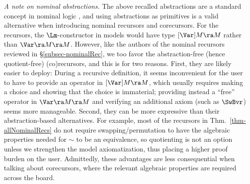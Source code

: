 \smallskip
\emph{A %
	note on nominal abstractions.} 
The above recalled abstractions are a standard concept in nominal logic \cite{DBLP:conf/lics/GabbayP99}, and using abstractions as primitives is a valid alternative when introducing nominal recursors and corecursors. For the recursors, %
the $\Lm$-constructor in models would have type $[\Var]M \ra M$ rather than $\Var \ra M \ra M$. 
%
However, %
like the authors of the nominal recursors reviewed in \S\ref{subsec-nominalRec}, we too %
favor the abstraction-free (hence quotient-free) (co)recursors, and this is for two reasons. First, they are likely easier to deploy:  
During a recursive definition, it seems inconvenient for the user to have to provide an operator in $[\Var]M \ra M$, which usually requires making a choice and showing that the choice is immaterial; providing instead a ``free''  operator in $\Var \ra M \ra M$ and verifying an additional axiom (such as $\SwBvr$) seems more manageable. Second, 
they can be more expressive than their abstraction-based alternatives. For example, most of the recursors in Thm.~\ref{thm-allNominalRecs} do not require swapping/permutation to have the algebraic properties needed for $\sim$ to be an equivalence, so quotienting is not an option unless we %
strengthen the model axiomatization, thus 
placing a higher proof burden on the user. 
Admittedly, these advantages are %
less consequential when talking about corecursors, where the relevant algebraic properties  
are required across the board. 





